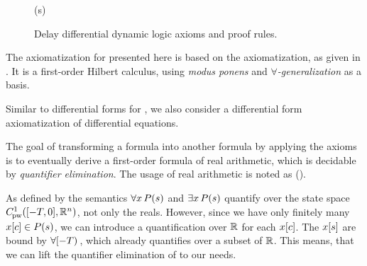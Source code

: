 \begin{figure}[t]
\begin{calculuscollections}{\textwidth}
\begin{calculus}
{{                }{
                    \bsfml(s)
                }
            }{}
        \end{calculus}
        \end{calculuscollections}
        \caption{Delay differential dynamic logic axioms and proof rules.}
        \label{fig:axioms}
    \end{figure}


    The axiomatization for \ddL presented here is based on the \dL axiomatization, as given in \cite{Platzer12Complete}.
    It is a first-order Hilbert calculus, using \emph{modus ponens} and \emph{$\forall$-generalization} as a basis.



    Similar to differential forms for \dL \cite{Platzer15Uniform}, we also consider a differential form axiomatization of differential equations.

    The goal of transforming a \ddL formula into another formula by applying the axioms is to eventually derive a first-order formula of real arithmetic, which is decidable by \emph{quantifier elimination}. The usage of real arithmetic is noted as ().

    As defined by the semantics $\forall x{\,} P(s)$ and $\exists x{\,} P(s)$ quantify over the state space $\statespace$, not only the reals.
    However, since we have only finitely many $x[c]\in P(s)$, we can introduce a quantification over $\mathbb{R}$ for each $x[c]$. The $x[s]$ are bound by $\forall [-T){\,}$, which already quantifies over a subset of $\mathbb{R}$.
    This means, that we can lift the quantifier elimination of \FOLR to our needs.

